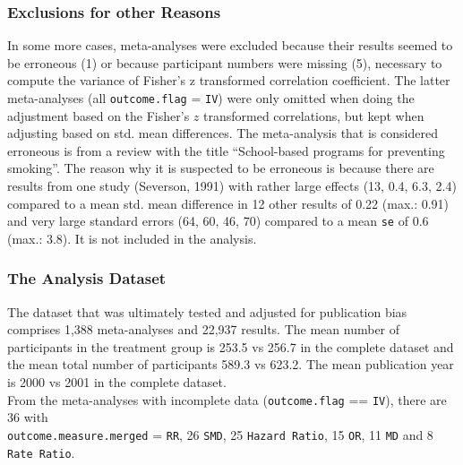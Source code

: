 \documentclass[11pt,a4paper,twoside]{book}\usepackage[]{graphicx}\usepackage[]{color}
\begin{document}
\subsubsection{Exclusions for other Reasons}
In some more cases, meta-analyses were excluded because their results seemed to be erroneous (1) or because participant numbers were missing (5), necessary to compute the variance of Fisher's z transformed correlation coefficient. The latter meta-analyses (all \texttt{outcome.flag} = \texttt{IV}) were only omitted when doing the adjustment based on the Fisher's $z$ transformed correlations, but kept when adjusting based on std. mean differences. The meta-analysis that is considered erroneous is from a review with the title ``School-based programs for preventing smoking''. The reason why it is suspected to be erroneous is because there are results from one study (Severson, 1991) with rather large effects (13, 0.4, 6.3, 2.4) compared to a mean std. mean difference in 12 other results of 0.22 (max.: 0.91) and very large standard errors (64, 60, 46, 70) compared to a mean \texttt{se} of 0.6 (max.: 3.8). It is not included in the analysis.

\subsubsection{The Analysis Dataset}
The dataset that was ultimately tested and adjusted for publication bias comprises 1,388 meta-analyses and 22,937 results. The mean number of participants in the treatment group is 253.5 vs 256.7 in the complete dataset and the mean total number of participants 589.3 vs 623.2. The mean publication year is 2000 vs 2001 in the complete dataset. \\
From the meta-analyses with incomplete data (\texttt{outcome.flag} == \texttt{IV}), there are 36 with \\ \texttt{outcome.measure.merged} = \texttt{RR}, 26 \texttt{SMD},  25 \texttt{Hazard Ratio}, 15 \texttt{OR}, 11 \texttt{MD} and 8 \texttt{Rate Ratio}.
\end{document}
